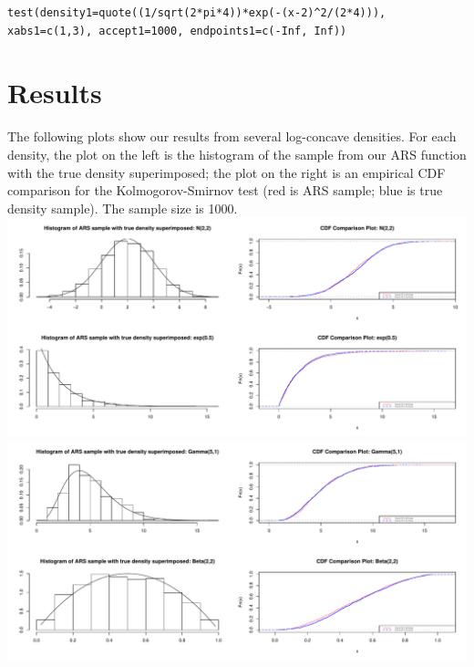 \documentclass{article}
\begin{document}
\begin{lstlisting}
test(density1=quote((1/sqrt(2*pi*4))*exp(-(x-2)^2/(2*4))), xabs1=c(1,3), accept1=1000, endpoints1=c(-Inf, Inf))
\end{lstlisting}

\section{Results}
The following plots show our results from several log-concave densities. For each density, the plot on the left is the histogram of the sample from our ARS function with the true density superimposed; the plot on the right is an empirical CDF comparison for the Kolmogorov-Smirnov test (red is ARS sample; blue is true density sample). The sample size is 1000.\\

\includegraphics[scale=0.45]{plot1.pdf}\\

\includegraphics[scale=0.45]{plot4.pdf}
\end{document}
